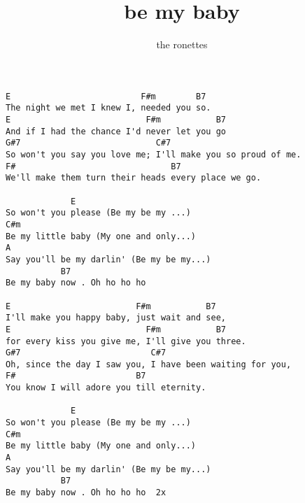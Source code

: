 \author{the ronettes}
\title{be my baby}
\maketitle
\begin{verbatim}
E                          F#m        B7
The night we met I knew I, needed you so.
E                           F#m           B7
And if I had the chance I'd never let you go
G#7                           C#7
So won't you say you love me; I'll make you so proud of me.
F#                               B7
We'll make them turn their heads every place we go.

             E
So won't you please (Be my be my ...)
C#m
Be my little baby (My one and only...)
A
Say you'll be my darlin' (Be my be my...)
           B7
Be my baby now . Oh ho ho ho

E                         F#m           B7
I'll make you happy baby, just wait and see,
E                           F#m           B7
for every kiss you give me, I'll give you three.
G#7                          C#7
Oh, since the day I saw you, I have been waiting for you,
F#                        B7
You know I will adore you till eternity.

             E
So won't you please (Be my be my ...)
C#m
Be my little baby (My one and only...)
A
Say you'll be my darlin' (Be my be my...)
           B7
Be my baby now . Oh ho ho ho  2x
\end{verbatim}